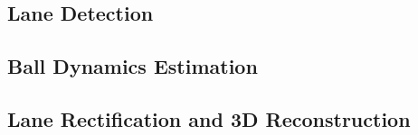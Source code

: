 \subsection{Lane Detection}
\label{sec:lane_detection}


\subsection{Ball Dynamics Estimation}
\label{sec:ball_tracking}


\subsection{Lane Rectification and 3D Reconstruction}
\label{sec:rectification_reconstruction}
